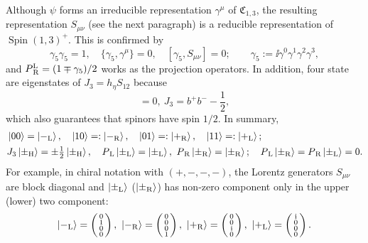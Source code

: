 \documentclass[CheatSheet]{subfiles}
\begin{document}
Although $\psi$ forms an irreducible representation $\gamma^\mu$ of $\mathfrak C_{1,3}$, the resulting representation $S_{\mu\nu}$ (see the next paragraph) is a reducible representation of $\mathop{\mathrm {Spin}}(1,3)^+$.
This is confirmed by
\begin{equation}
 \gamma_5\gamma_5=1,\quad
\{\gamma_5,\gamma^\mu\}=0,\quad
 [\gamma_5,S_{\mu\nu}]=0;\qquad \gamma_5:=\ii\gamma^0\gamma^1\gamma^2\gamma^3,
\end{equation}
and $P{}^{\text L}\w{R} =(1\mp\gamma_5)/2$ works as the projection operators.
In addition, four state are eigenstates of $J_3=h_\eta S_{12}$ because 
\begin{equation}
 [J_3,b^+b^-] = 0,~
 J_3=b^+b^--\frac12,
\end{equation}
which also guarantees that spinors have spin $1/2$.
In summary,
\begin{align}
 &\ket{00} =\ket{-\w L},\quad
 \ket{10} =:\ket{-\w R},\quad
 \ket{01} =:\ket{+\w R},\quad
 \ket{11} =:\ket{+\w L};\\
&J_3\ket{\pm\w H}=\pm\tfrac12\ket{\pm\w H},\quad
\PL\ket{\pm\w L}=\ket{\pm\w L},~
\PR\ket{\pm\w R}=\ket{\pm\w R};\quad
\PL\ket{\pm\w R}=
\PR\ket{\pm\w L}=0.
\end{align}
For example, in chiral notation with $(+,-,-,-)$, the Lorentz generators $S_{\mu\nu}$ are block diagonal and $\ket{\pm\w L}$ ($\ket{\pm\w R}$) has non-zero component only in the upper (lower) two component:
\begin{equation}
 \ket{-\w L} = \spmat{0\\1\\0\\0},~
 \ket{-\w R} = \spmat{0\\0\\0\\1},~
 \ket{+\w R} = \spmat{0\\0\\\ii\\0},~
 \ket{+\w L} = \spmat{\ii\\0\\0\\0}.
\end{equation}
\end{document}
